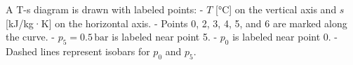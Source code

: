 A T-s diagram is drawn with labeled points:  
- \( T \) [°C] on the vertical axis and \( s \) [kJ/kg·K] on the horizontal axis.  
- Points 0, 2, 3, 4, 5, and 6 are marked along the curve.  
- \( p_5 = 0.5 \, \text{bar} \) is labeled near point 5.  
- \( p_0 \) is labeled near point 0.  
- Dashed lines represent isobars for \( p_0 \) and \( p_5 \).